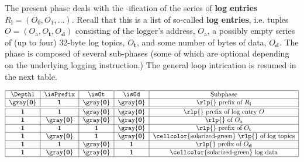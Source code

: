 \begin{center}
\end{center}
The present phase deals with the \rlp{}-ification of the series of \textbf{log entries} $R_\mathbf{l} = (O_0, O_1, \dots)$. Recall that this is a list of so-called \textbf{log entries}, i.e. tuples $O = (O_\text{a}, O_\textbf{t}, O_\textbf{d})$ consisting of the logger’s address, $O_\text{a}$, a possibly empty series of (up to four) 32-byte log topics, $O_\textbf{t}$, and some number of bytes of data, $O_\textbf{d}$.
The phase is composed of several sub-phases (some of which are \colorbox{solarized-green}{optional} depending on the underlying logging instruction.)
The general loop intrication is resumed in the next table.
\begin{table}[h]
	\def\zero{\gray{\textbf{0}}}
	\def\one{\textbf{1}}
	\renewcommand{\arraystretch}{1.3}
	\centering
	\caption{The first phase (establishing the \rlp{} prefix of $R_\mathbf{l}$) is performed once at the start. The \rlp{}-ization of the log entries is done as many times as there are log entries for that transaction.}
	\[
		\begin{tabular}{|c|c|c|c|c|c|c|c|c|}
			\hline
			$\Depth1$ & \isPrefix & $\isOt $ & \isOd & Subphase                                                              \\ \hline
			\zero     & \one      & \zero    & \zero & \rlp{} prefix of $R_\mathbf{l}$                                 \\ \hline \hline
			\one      & \one      & \zero    & \zero & \rlp{} prefix of log entry $O$                                  \\ \hline
			\one      & \zero     & \zero    & \zero & \rlp{} of $O_\text{a}$                                          \\ \hline
			\one      & \one      & \one     & \zero & \rlp{} prefix of $O_\textbf{t}$                                 \\ \hline
			\one      & \zero     & \one     & \zero & \cellcolor{solarized-green} \rlp{} of log topics                \\ \hline
			\one      & \one      & \zero    & \one  & \rlp{} prefix of $O_\textbf{d}$                                 \\ \hline
			\one      & \zero     & \zero    & \one  & \cellcolor{solarized-green} log data                                  \\ \hline
		\end{tabular}
\]
\end{table}
